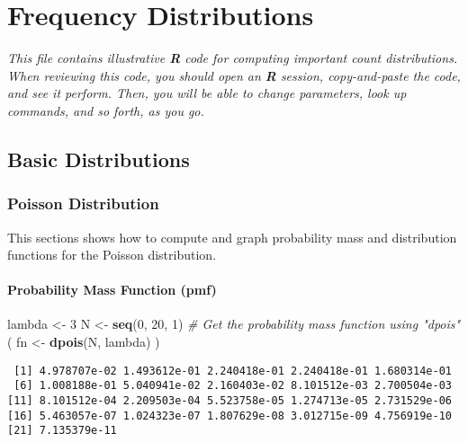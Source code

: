 \documentclass[]{book}
\newenvironment{Shaded}{\begin{snugshade}}{\end{snugshade}}
\newcommand{\KeywordTok}[1]{\textcolor[rgb]{0.13,0.29,0.53}{\textbf{#1}}}
\newcommand{\DecValTok}[1]{\textcolor[rgb]{0.00,0.00,0.81}{#1}}
\newcommand{\StringTok}[1]{\textcolor[rgb]{0.31,0.60,0.02}{#1}}
\newcommand{\CommentTok}[1]{\textcolor[rgb]{0.56,0.35,0.01}{\textit{#1}}}
\newcommand{\NormalTok}[1]{#1}
\theoremstyle{definition}
\theoremstyle{definition}
\theoremstyle{definition}
\theoremstyle{remark}
\begin{document}
\chapter{Frequency Distributions}\label{frequency-distributions}

\emph{This file contains illustrative \textbf{R} code for computing
important count distributions. When reviewing this code, you should open
an \textbf{R} session, copy-and-paste the code, and see it perform.
Then, you will be able to change parameters, look up commands, and so
forth, as you go.}

\section{Basic Distributions}\label{basic-distributions}

\subsection{Poisson Distribution}\label{poisson-distribution}

This sections shows how to compute and graph probability mass and
distribution functions for the Poisson distribution.

\subsubsection{Probability Mass Function
(pmf)}\label{probability-mass-function-pmf}

\begin{Shaded}
\begin{Highlighting}[]
\NormalTok{lambda <-}\StringTok{ }\DecValTok{3}
\NormalTok{N <-}\StringTok{ }\KeywordTok{seq}\NormalTok{(}\DecValTok{0}\NormalTok{, }\DecValTok{20}\NormalTok{, }\DecValTok{1}\NormalTok{)}
\CommentTok{# Get the probability mass function using "dpois"}
\NormalTok{( fn <-}\StringTok{ }\KeywordTok{dpois}\NormalTok{(N, lambda) )}
\end{Highlighting}
\end{Shaded}

\begin{verbatim}
 [1] 4.978707e-02 1.493612e-01 2.240418e-01 2.240418e-01 1.680314e-01
 [6] 1.008188e-01 5.040941e-02 2.160403e-02 8.101512e-03 2.700504e-03
[11] 8.101512e-04 2.209503e-04 5.523758e-05 1.274713e-05 2.731529e-06
[16] 5.463057e-07 1.024323e-07 1.807629e-08 3.012715e-09 4.756919e-10
[21] 7.135379e-11
\end{verbatim}
\end{document}
